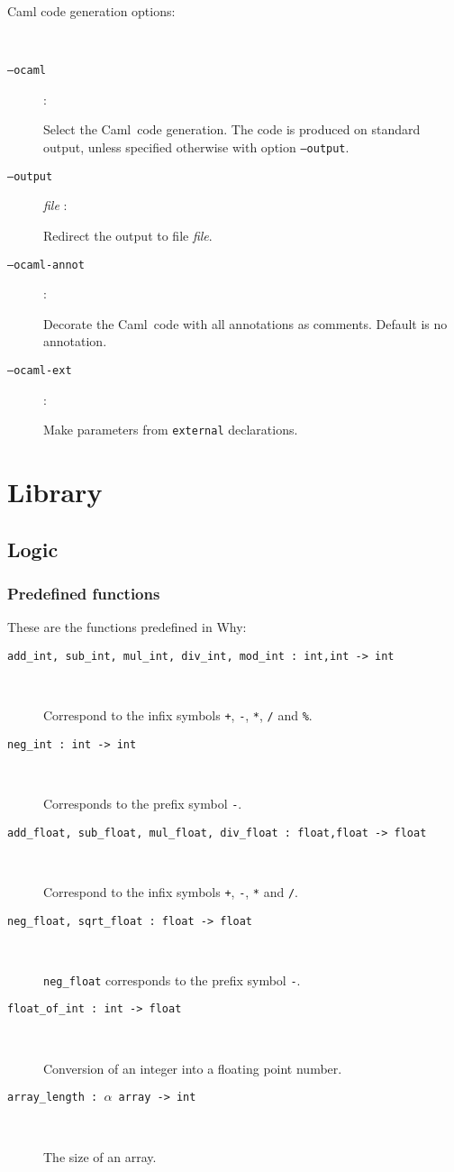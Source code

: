 \documentclass[a4paper,12pt]{report}
\newcommand{\caml}{\textsf{Caml}}
\newcommand{\why}{\textsf{Why}}
\begin{document}
\begin{description}
  \item[Caml code generation options:] ~\par
  \item[\texttt{--ocaml}]: ~\par 
    Select the \caml\ code generation. The code is produced on
    standard output, unless specified otherwise with option \texttt{--output}.
  \item[\texttt{--output}] \textit{file} : ~\par 
    Redirect the output to file \textit{file}.
  \item[\texttt{--ocaml-annot}]: ~\par 
    Decorate the \caml\ code with all annotations as comments. Default
    is no annotation.
  \item[\texttt{--ocaml-ext}]: ~\par 
    Make parameters from \texttt{external} declarations.
    
\end{description}


\section{Library}
\label{library}

\subsection{Logic}
\label{lib:logic}

\subsubsection{Predefined functions}

These are the functions predefined in \why:
\begin{description}
\item[\texttt{add\_int, sub\_int, mul\_int, div\_int, mod\_int :
    int,int -> int}] ~\par
  Correspond to the infix symbols
  \texttt{+}, \texttt{-}, \texttt{*}, \texttt{/} and \texttt{\%}.
\item[\texttt{neg\_int : int -> int}] ~\par
  Corresponds to the prefix symbol \texttt{-}.
\item[\texttt{add\_float, sub\_float, mul\_float, div\_float :
    float,float -> float}] ~\par
  Correspond to the infix symbols
  \texttt{+}, \texttt{-}, \texttt{*} and \texttt{/}.
\item[\texttt{neg\_float, sqrt\_float : float -> float}] ~\par
  \texttt{neg\_float} corresponds to the prefix symbol \texttt{-}.
\item[\texttt{float\_of\_int : int -> float}] ~\par
  Conversion of an integer into a floating point number.
\item[\texttt{array\_length : $\alpha$ array -> int}] ~\par
  The size of an array.
\end{description}
\end{document}
